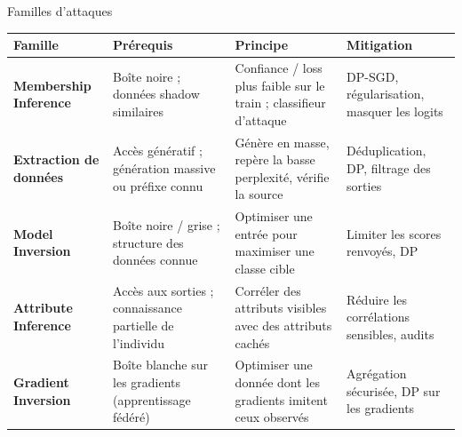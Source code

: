 \documentclass[aspectratio=169, 10pt, table]{beamer}
\begin{document}
\begin{frame}{Familles d'attaques}
    \begin{table}
        \renewcommand{\arraystretch}{1.4}
        \footnotesize
        \begin{tabularx}{\textwidth}{>{\bfseries}l >{\raggedright\arraybackslash}X >{\raggedright\arraybackslash}X >{\raggedright\arraybackslash}X}
            \toprule
            \rowcolor{TSPblue}\color{white}\textbf{\footnotesize Famille} & \color{white}\textbf{\footnotesize Prérequis} & \color{white}\textbf{\footnotesize Principe} & \color{white}\textbf{\footnotesize Mitigation} \\
            \midrule
            Membership Inference & Boîte noire ; données shadow similaires & Confiance / loss plus faible sur le train ; classifieur d'attaque & DP-SGD, régularisation, masquer les logits \\
            Extraction de données & Accès génératif ; génération massive ou préfixe connu & Génère en masse, repère la basse perplexité, vérifie la source & Déduplication, DP, filtrage des sorties \\
            Model Inversion & Boîte noire / grise ; structure des données connue & Optimiser une entrée pour maximiser une classe cible & Limiter les scores renvoyés, DP \\
            Attribute Inference & Accès aux sorties ; connaissance partielle de l'individu & Corréler des attributs visibles avec des attributs cachés & Réduire les corrélations sensibles, audits \\
            Gradient Inversion & Boîte blanche sur les gradients (apprentissage fédéré) & Optimiser une donnée dont les gradients imitent ceux observés & Agrégation sécurisée, DP sur les gradients \\
            \bottomrule
        \end{tabularx}
    \end{table}
\end{frame}
\end{document}
